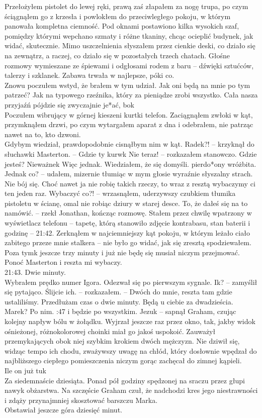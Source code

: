 \documentclass[../MAIN.tex]{subfiles}
\begin{document}
Przełożyłem pistolet do lewej ręki, prawą zaś złapałem za nogę trupa, po czym ściągnąłem go z krzesła i powlokłem do przeciwległego pokoju, w którym panowała kompletna ciemność. Pod oknami postawiono kilka wysokich szaf, pomiędzy którymi wepchano szmaty i różne tkaniny, chcąc ocieplić budynek, jak widać, skutecznie. Mimo uszczelnienia słyszałem przez cienkie deski, co działo się na zewnątrz, a raczej, co działo się w pozostałych trzech chatach. Głośne rozmowy wymieszane ze śpiewami i odgłosami rodem z baru -- dźwięki sztućców, talerzy i szklanek. Zabawa trwała w najlepsze, póki co.\\
Znowu poczułem wstyd, że brałem w tym udział. Jak oni będą na mnie po tym patrzeć? Jak na typowego rzeźnika, który za pieniądze zrobi wszystko. Cała nasza przyjaźń pójdzie się zwyczajnie je*ać, bo\3k\\
Poczułem wibrujący w górnej kieszeni kurtki telefon. Zaciągnąłem zwłoki w kąt, przymknąłem drzwi, po czym wytargałem aparat z dna i odebrałem, nie patrząc nawet na to, kto dzwoni.\\
Gdybym wiedział, prawdopodobnie cisnąłbym nim w kąt.
\sx Radek?! -- krzyknął do słuchawki Masterton. -- Gdzie ty kurw\3k
\xx Nie teraz! -- rozkazałem stanowczo.
\xx Gdzie jesteś?
\xx Nieważne\3k
\xx Więc jednak.
\qd
Wiedziałem, że się domyśli. pierdo*ony wróżbita.
\sx Jednak co? -- udałem, mizernie tłumiąc w mym głosie wyraźnie słyszalny strach.
\xx Nie bój się. Choć nawet ja nie robię takich rzeczy, to wraz z resztą wybaczymy ci ten jeden raz.
\xx Wybaczyć co?! -- wrzasnąłem, uderzywszy czubkiem tłumika pistoletu w ścianę, omal nie robiąc dziury w starej desce.
\xx To, że dałeś się na to namówić. -- rzekł Jonathan, kończąc rozmowę.
\qd
Stałem przez chwilę wpatrzony w wyświetlacz telefonu -- tapetę, którą stanowiło zdjęcie kontrabasu, stan baterii i godzinę -- 21:42. Zerknąłem w najciemniejszy kąt pokoju, w którym leżało ciało zabitego przeze mnie stalkera -- nie było go widać, jak się zresztą spodziewałem. Poza tym\3k jeszcze trzy minuty i już nie będę się musiał niczym przejmować. Ponoć Masterton i reszta mi wybaczy.\\
21:43. Dwie minuty.\\
Wybrałem prędko numer Igora. Odezwał się po pierwszym sygnale.
\sx I\3k? -- zamyślił się pytająco.
\xx Ślijcie ich. -- rozkazałem. -- Dwóch do mnie, reszta tam gdzie ustaliliśmy. Przedłużam czas o dwie minuty.
\xx Będą u ciebie za dwadzieścia.
\xx Marek?
\xx Po nim.
:47 i będzie po wszystkim.
% 
\dd\sx Jezu\3k -- sapnął Graham, czując kolejny napływ bólu w żołądku.
\qd
Wyjrzał jeszcze raz przez okno, tak, jakby widok ośnieżonej, różnokolorowej choinki miał go jakoś uspokoić. Zauważył przemykających obok niej szybkim krokiem dwóch mężczyzn. Nie dziwił się, widząc tempo ich chodu, zważywszy uwagę na chłód, który dosłownie wpędzał do najbliższego ciepłego pomieszczenia niczym gorąc zachęcał do zimnej kąpieli.\\
Ile on już tu\3k\\
Za siedemnaście dziesiąta. Ponad pół godziny spędzonej na sraczu przez głupi nawyk obżarstwa. Na szczęście Graham czuł, że nadchodzi kres jego niestrawności i zdąży przynajmniej skosztować barszczu Marka.\\
Obstawiał jeszcze góra dziesięć minut.
\end{document}
